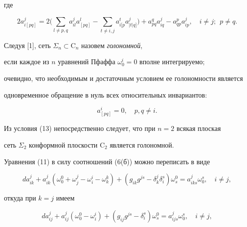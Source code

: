 где 


\begin{equation} 


2a^j_{i[pq]}=2\Big(\sum_{l\ne p,q}a^j_{il}a^l_{[pq]}- 


\sum_{t\ne i,j}a{}^t_{i[p}a{}^j_{|t|q]}\Big)+ 


a^q_{pq}a^j_{iq}-a^p_{qp}a^j_{ip},\quad i\ne j;\ \ p\ne q. 


\end{equation} 


 


Следуя [1], сеть $\Sigma_n\subset\mathrm C_n$ назовем {\it голономной}, 


если каждое из $n$ уравнений Пфаффа $\omega^i_0=0$ вполне интегрируемо; 


очевидно, что необходимым и достаточным условием ее голономности является 


одновременное обращение в нуль всех относительных инвариантов: 


\begin{equation} 


a^i_{[pq]}=0,\quad p,q\ne i. 


\end{equation} 


 


Из условия (13) непосредственно следует, что при $n=2$ всякая плоская 


сеть $\Sigma_2$ конформной плоскости $\mathrm C_2$ является голономной. 


 


Уравнения (11) в силу соотношений (6(б)) можно переписать в виде 


$$ 


da^j_{ik}+a^j_{ik}(\omega^0_0+\omega^j_j-\omega^i_i- 


\omega^k_k)+(g_{ik}g^{js}-\delta^j_k\delta^s_i) 


\omega^0_s=a^j_{iks}\omega^s_0,\quad i\ne j, 


$$ 


откуда при $k=j$ имеем 


\begin{equation} 


da^j_{ij}+a^j_{ij}(\omega^0_0-\omega^i_i)+(g_{ij}g^{js}- 


\delta^s_i)\omega^0_s=a^j_{ijs}\omega^s_0,\quad i\ne j, 


\end{equation} 


